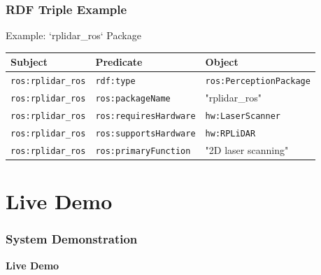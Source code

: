 \documentclass{beamer}
\begin{document}
\begin{frame}
  \frametitle{RDF Triple Example}
  \begin{block}{Example: `rplidar\_ros` Package}
    \small
    \begin{tabular}{lll}
      \textbf{Subject} & \textbf{Predicate} & \textbf{Object} \\
      \midrule
      \texttt{ros:rplidar\_ros} & \texttt{rdf:type} & \texttt{ros:PerceptionPackage} \\
      \texttt{ros:rplidar\_ros} & \texttt{ros:packageName} & "rplidar\_ros" \\
      \texttt{ros:rplidar\_ros} & \texttt{ros:requiresHardware} & \texttt{hw:LaserScanner} \\
      \texttt{ros:rplidar\_ros} & \texttt{ros:supportsHardware} & \texttt{hw:RPLiDAR} \\
      \texttt{ros:rplidar\_ros} & \texttt{ros:primaryFunction} & "2D laser scanning" \\
    \end{tabular}
  \end{block}
\end{frame}




\section{Live Demo}
\begin{frame}
  \frametitle{System Demonstration}
 
  \begin{center}
    \Large\textbf{Live Demo}
  \end{center}

  \vspace{1cm}
 
\end{frame}
\end{document}

